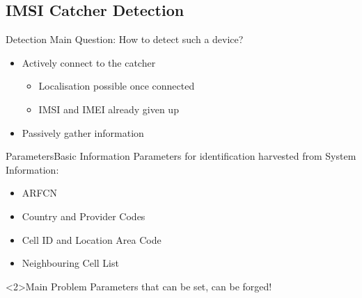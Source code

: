 \documentclass{beamer}
\begin{document}
\subsection{IMSI Catcher Detection}
\begin{frame}{Detection}
Main Question: How to detect such a device?
\begin{itemize}
	\item<1-> Actively connect to the catcher
	\begin{itemize}
		\item<1-> Localisation possible once connected
		\item<1-> IMSI and IMEI already given up
	\end{itemize}
	\item<1-> Passively gather information
\end{itemize}
\vspace{.8cm}
\end{frame}

\begin{frame}{Parameters}{Basic Information}
Parameters for identification harvested from System Information:
\begin{itemize}
	\item ARFCN
	\item Country and Provider Codes
	\item Cell ID and Location Area Code
	\item Neighbouring Cell List
\end{itemize}
\begin{alertblock}<2>{Main Problem}
Parameters that can be set, can be forged!
\end{alertblock}
\end{frame}
\end{document}
